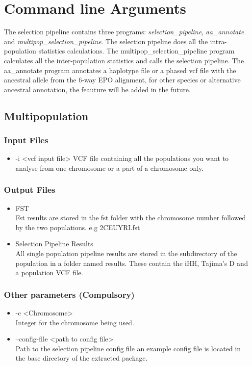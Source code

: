 \documentclass[a4paper,10pt]{article}
\begin{document}
\section{Command line Arguments}
The selection pipeline contains three programs:
\emph{selection\_pipeline}, \emph{aa\_annotate} and
\emph{multipop\_selection\_pipeline}. The selection pipeline does all the
intra-population statistics calculations. The multipop\_selection\_pipeline program
calculates all the inter-population statistics and calls the selection
pipeline. The aa\_annotate program annotates a haplotype file or a
phased vcf file with the ancestral allele from the 6-way EPO
alignment, for other species or alternative ancestral annotation, the
feauture will be added in the future.

\subsection{Multipopulation}
\subsubsection{Input Files}
\begin{itemize}
\item -i <vcf input file>
VCF file containing all the populations you want to analyse from one chromosome or a part of a chromosome only. 
\end{itemize}
\subsubsection{Output Files}
\begin{itemize}
\item FST \\
Fst results are stored in the fst folder with the chromosome number followed by the two populations. e.g 2CEUYRI.fst
\item Selection Pipeline Results\\
All single population pipeline results are stored in the subdirectory of the population in a folder named results. These contain the iHH, Tajima's D and a population VCF file.
\end{itemize}
\subsubsection{Other parameters (Compulsory)}
\begin{itemize}
\item -c <Chromosome>\\
Integer for the chromosome being used.
\item --config-file <path to config file>\\
Path to the selection pipeline config file an example config file is located in the base directory of the extracted package.
\end{itemize}
\end{document}
